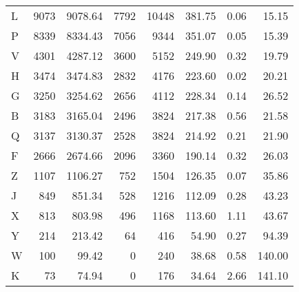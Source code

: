 \begin{tabular}{lrrrrrrr}
     L &          9073 &           9078.64 &              7792 &             10448 &              381.75 &                    0.06 &                   15.15 \\
     P &          8339 &           8334.43 &              7056 &              9344 &              351.07 &                    0.05 &                   15.39 \\
     V &          4301 &           4287.12 &              3600 &              5152 &              249.90 &                    0.32 &                   19.79 \\
     H &          3474 &           3474.83 &              2832 &              4176 &              223.60 &                    0.02 &                   20.21 \\
     G &          3250 &           3254.62 &              2656 &              4112 &              228.34 &                    0.14 &                   26.52 \\
     B &          3183 &           3165.04 &              2496 &              3824 &              217.38 &                    0.56 &                   21.58 \\
     Q &          3137 &           3130.37 &              2528 &              3824 &              214.92 &                    0.21 &                   21.90 \\
     F &          2666 &           2674.66 &              2096 &              3360 &              190.14 &                    0.32 &                   26.03 \\
     Z &          1107 &           1106.27 &               752 &              1504 &              126.35 &                    0.07 &                   35.86 \\
     J &           849 &            851.34 &               528 &              1216 &              112.09 &                    0.28 &                   43.23 \\
     X &           813 &            803.98 &               496 &              1168 &              113.60 &                    1.11 &                   43.67 \\
     Y &           214 &            213.42 &                64 &               416 &               54.90 &                    0.27 &                   94.39 \\
     W &           100 &             99.42 &                 0 &               240 &               38.68 &                    0.58 &                  140.00 \\
     K &            73 &             74.94 &                 0 &               176 &               34.64 &                    2.66 &                  141.10 \\
\bottomrule
\end{tabular}
